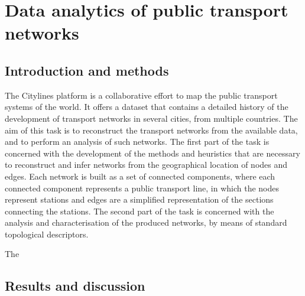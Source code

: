 \chapter{Data analytics of public transport networks}


\section{Introduction and methods}
 The Citylines platform is a collaborative effort to map the public transport systems of the world. It offers a dataset that contains a detailed history of the development of transport networks in several cities, from multiple countries. The aim of this task is to reconstruct the transport networks from the available data, and to perform an analysis of such networks. The first part of the task is concerned with the development of the methods and heuristics that are necessary to reconstruct and infer networks from the geographical location of nodes and edges. Each network is built as a set of connected components, where each connected component represents a public transport line, in which the nodes represent stations and edges are a simplified representation of the sections connecting the stations. The second part of the task is concerned with the analysis and characterisation of the produced networks, by means of standard topological descriptors.
 
 The 


\section{Results and discussion}



\newpage